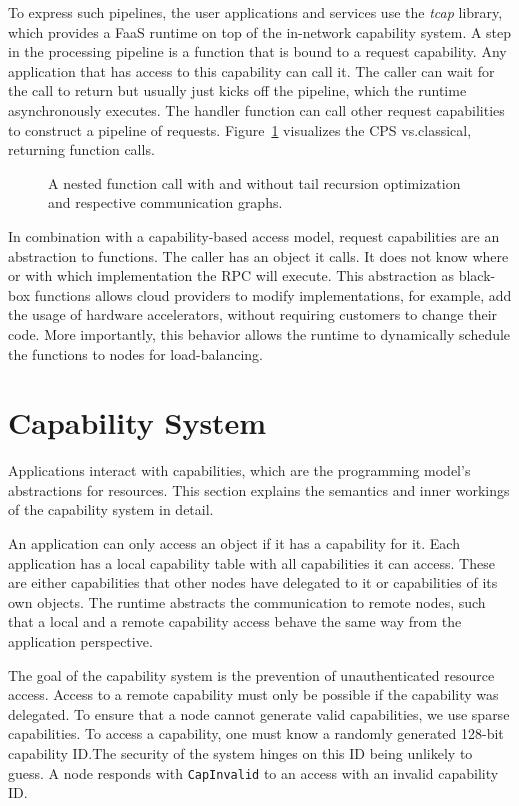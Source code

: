 To express such pipelines, the user applications and services use the \emph{tcap} library, which provides a \ac{FaaS} runtime on top of the in-network capability system. A step in the processing pipeline is a function that is bound to a request capability. Any application that has access to this capability can call it. The caller can wait for the call to return but usually just kicks off the pipeline, which the runtime asynchronously executes. The handler function can call other request capabilities to construct a pipeline of requests. Figure~\ref{fig:computation-model} visualizes the \ac{CPS} vs.\@ classical, returning function calls.

\begin{figure}[H]
  \centering
  \resizebox{\textwidth}{!}{
    
  }
  \caption{\label{fig:computation-model} A nested function call with and without tail recursion optimization and respective communication graphs.}
\end{figure}

In combination with a capability-based access model, request capabilities are an abstraction to functions. The caller has an object it calls. It does not know where or with which implementation the \ac{RPC} will execute. This abstraction as black-box functions allows cloud providers to modify implementations, for example, add the usage of hardware accelerators, without requiring customers to change their code. More importantly, this behavior allows the runtime to dynamically schedule the functions to nodes for load-balancing.

\section{Capability System}
Applications interact with capabilities, which are the programming model's abstractions for resources. This section explains the semantics and inner workings of the capability system in detail.

An application can only access an object if it has a capability for it. Each application has a local capability table with all capabilities it can access. These are either capabilities that other nodes have delegated to it or capabilities of its own objects.
The runtime abstracts the communication to remote nodes, such that a local and a remote capability access behave the same way from the application perspective.

The goal of the capability system is the prevention of unauthenticated resource access. Access to a remote capability must only be possible if the capability was delegated. To ensure that a node cannot generate valid capabilities, we use sparse capabilities. To access a capability, one must know a randomly generated 128-bit capability ID.\@ The security of the system hinges on this ID being unlikely to guess. A node responds with \texttt{CapInvalid} to an access with an invalid capability ID.\@

